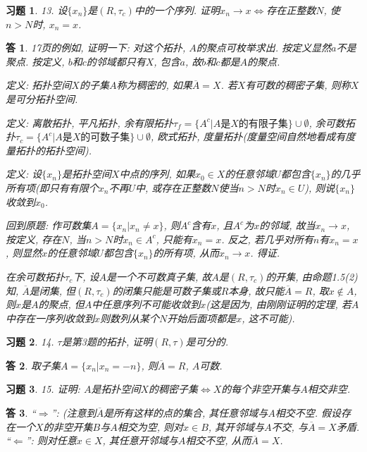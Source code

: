 \documentclass{ctexart}%
\newtheorem*{exercise}{习题}
\newtheorem*{solution}{答}
\theoremstyle{definition}
\theoremstyle{remark}
\begin{document}
\begin{exercise}13. 设$\{x_n\}$是$(R,\tau_c)$中的一个序列. 证明$x_n\rightarrow x\Longleftrightarrow$存在正整数$N$, 使$n>N$时, $x_n=x$.
\end{exercise}
\begin{solution}
17页的例如, 证明一下: 对这个拓扑, $A$的聚点可枚举求出. 按定义显然$a$不是聚点. 按定义, $b$和$c$的邻域都只有$X$, 包含$a$, 故$b$和$c$都是$A$的聚点. 

定义: 拓扑空间$X$的子集$A$称为稠密的, 如果$\overline{A}=X$. 若$X$有可数的稠密子集, 则称$X$是可分拓扑空间. 

定义: 离散拓扑, 平凡拓扑, 余有限拓扑$\tau_f=\{A^c|A\text{是}X\text{的有限子集}\}\cup\emptyset$, 余可数拓扑$\tau_c=\{A^c|A\text{是}X\text{的可数子集}\}\cup\emptyset$, 欧式拓扑, 度量拓扑(度量空间自然地看成有度量拓扑的拓扑空间).  

定义: 设$\{x_n\}$是拓扑空间$X$中点的序列, 如果$x_0\in X$的任意邻域$U$都包含$\{x_n\}$的几乎所有项(即只有有限个$x_n$不再$U$中, 或存在正整数$N$使当$n>N$时$x_n\in U$), 则说$\{x_n\}$收敛到$x_0$.

回到原题: 作可数集$A=\{x_n|x_n\neq x\}$, 则$A^c$含有$x$, 且$A^c$为$x$的邻域, 故当$x_n\rightarrow x$, 按定义, 存在$N$, 当$n>N$时$x_n \in A^c$, 只能有$x_n=x$. 反之, 若几乎对所有$n$有$x_n=x$, 则显然$x$的任意邻域$U$都包含$\{x_n\}$的所有项, 从而$x_n\rightarrow x$. 得证.

在余可数拓扑$\tau_c$下, 设$A$是一个不可数真子集, 故$A$是$(R,\tau_c)$的开集, 由命题1.5(2)知, $\overline{A}$是闭集, 但$(R,\tau_c)$的闭集只能是可数子集或$R$本身, 故只能$\overline{A}=R$, 取$x\notin A$, 则$x$是$A$的聚点, 但$A$中任意序列不可能收敛到$x$(这是因为, 由刚刚证明的定理, 若$A$中存在一序列收敛到$x$则数列从某个$N$开始后面项都是$x$, 这不可能). 
\end{solution}

\begin{exercise}14. $\tau$是第3题的拓扑, 证明$(R,\tau)$是可分的.
\end{exercise}
\begin{solution}
取子集$A=\{x_n|x_n=-n\}$, 则$\overline{A}=R$, $A$可数. 
\end{solution}

\begin{exercise}15. 证明: $A$是拓扑空间$X$的稠密子集$\Longleftrightarrow X$的每个非空开集与$A$相交非空. 
\end{exercise}
\begin{solution}
``$\Longrightarrow$'': (注意到$\overline{A}$是所有这样的点的集合, 其任意邻域与$A$相交不空. 假设存在一个$X$的非空开集$B$与$A$相交为空, 则对$x\in B$, 其开邻域与$A$不交, 与$\overline{A}=X$矛盾. ``$\Longleftarrow$'': 则对任意$x\in X$, 其任意开邻域与$A$相交不空, 从而$\overline{A}= X$. 
\end{solution}
\end{document}
